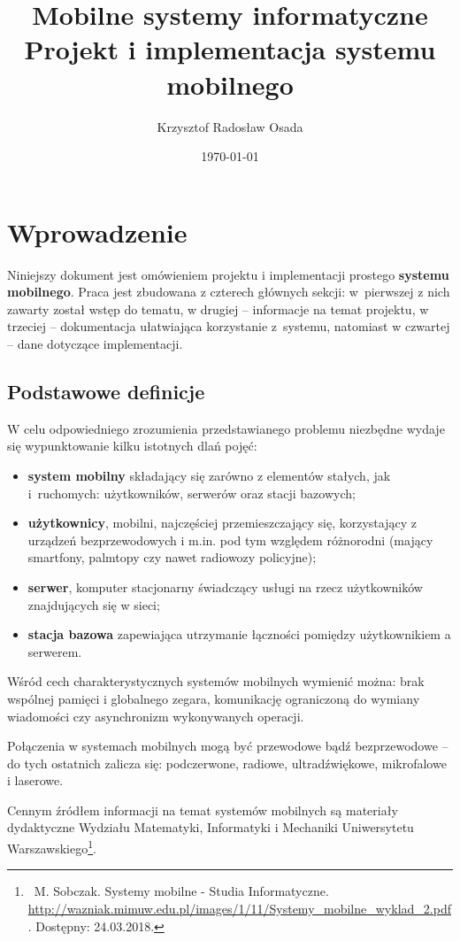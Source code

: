 \documentclass[12pt, a4paper]{article}
\title{Mobilne systemy informatyczne \\\normalsize\textbf{Projekt i implementacja systemu mobilnego}}
\author{Krzysztof Radosław Osada}
\date{\today}
\begin{document}
\maketitle

\tableofcontents

\section{Wprowadzenie}
Niniejszy dokument jest omówieniem projektu i implementacji prostego \textbf{systemu mobilnego}. Praca jest zbudowana z czterech głównych sekcji: w~pierwszej z nich zawarty został wstęp do tematu, w drugiej -- informacje na temat projektu, w trzeciej -- dokumentacja ułatwiająca korzystanie z~systemu, natomiast w czwartej -- dane dotyczące implementacji.

\subsection{Podstawowe definicje}
W celu odpowiedniego zrozumienia przedstawianego problemu niezbędne wydaje się wypunktowanie kilku istotnych dlań pojęć:
\begin{itemize}
    \item \textbf{system mobilny} składający się zarówno z elementów stałych, jak i~ruchomych: użytkowników, serwerów oraz stacji bazowych;
    \item \textbf{użytkownicy}, mobilni, najczęściej przemieszczający się, korzystający z urządzeń bezprzewodowych i m.in. pod tym względem różnorodni (mający smartfony, palmtopy czy nawet radiowozy policyjne);
    \item \textbf{serwer}, komputer stacjonarny świadczący usługi na rzecz użytkowników znajdujących się w sieci;
    \item \textbf{stacja bazowa} zapewiająca utrzymanie łączności pomiędzy użytkownikiem a serwerem.
\end{itemize}

Wśród cech charakterystycznych systemów mobilnych wymienić można: brak wspólnej pamięci i globalnego zegara, komunikację ograniczoną do wymiany wiadomości czy asynchronizm wykonywanych operacji.

Połączenia w systemach mobilnych mogą być przewodowe bądź bezprzewodowe -- do tych ostatnich zalicza się: podczerwone, radiowe, ultradźwiękowe, mikrofalowe i laserowe.

Cennym źródłem informacji na temat systemów mobilnych są materiały dydaktyczne Wydziału Matematyki, Informatyki i Mechaniki Uniwersytetu Warszawskiego\footnote{\ M. Sobczak. Systemy mobilne - Studia Informatyczne. \url{http://wazniak.mimuw.edu.pl/images/1/11/Systemy_mobilne_wyklad_2.pdf}. Dostępny: 24.03.2018.}.
\end{document}
